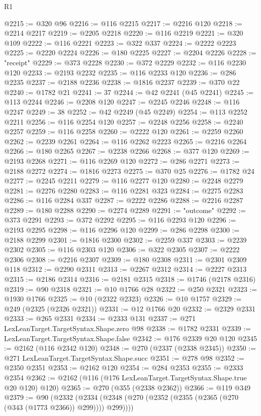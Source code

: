 \begin{lexlean}{R1}
\begin{coremodule}
@2215 := @320 @96
@2216 := @116 @2215
@2217 := @2216 @120
@2218 := @2214 @2217
@2219 := @2205 @2218
@2220 := @116 @2219
@2221 := @320 @109
@2222 := @116 @2221
@2223 := @322 @337
@2224 := @2222 @2223
@2225 := @2220 @2224
@2226 := @180 @2225
@2227 := @2204 @2226
@2228 := "receipt"
@2229 := @373 @2228
@2230 := @372 @2229
@2232 := @116 @2230 @120
@2233 := @2193 @2232
@2235 := @116 @2233 @120
@2236 := @286 @2235
@2237 := @2188 @2236
@2238 := @1816 @2237
@2239 := @370 @22
@2240 := @1782 @21
@2241 := 37
@2244 := @42 @2241 (@45 @2241)
@2245 := @113 @2244
@2246 := @2208 @120
@2247 := @2245 @2246
@2248 := @116 @2247
@2249 := 38
@2252 := @42 @2249 (@45 @2249)
@2254 := @113 @2252 @2211
@2256 := @116 @2254 @120
@2257 := @2248 @2256
@2258 := @2240 @2257
@2259 := @116 @2258
@2260 := @2222 @120
@2261 := @2259 @2260
@2262 := @2239 @2261
@2264 := @116 @2262 @2223
@2265 := @2216 @2264
@2266 := @180 @2265
@2267 := @2238 @2266
@2268 := @377 @120
@2269 := @2193 @2268
@2271 := @116 @2269 @120
@2272 := @286 @2271
@2273 := @2188 @2272
@2274 := @1816 @2273
@2275 := @370 @25
@2276 := @1782 @24
@2277 := @2245 @2211
@2279 := @116 @2277 @120
@2280 := @2248 @2279
@2281 := @2276 @2280
@2283 := @116 @2281 @323
@2284 := @2275 @2283
@2286 := @116 @2284 @337
@2287 := @2222 @2286
@2288 := @2216 @2287
@2289 := @180 @2288
@2290 := @2274 @2289
@2291 := "outcome"
@2292 := @373 @2291
@2293 := @372 @2292
@2295 := @116 @2293 @120
@2296 := @2193 @2295
@2298 := @116 @2296 @120
@2299 := @286 @2298
@2300 := @2188 @2299
@2301 := @1816 @2300
@2302 := @2259 @337
@2303 := @2239 @2302
@2305 := @116 @2303 @120
@2306 := @322 @2305
@2307 := @2222 @2306
@2308 := @2216 @2307
@2309 := @180 @2308
@2311 := @2301 @2309 @118
@2312 := @2290 @2311
@2313 := @2267 @2312
@2314 := @2227 @2313
@2315 := @2186 @2314
@2316 := @2181 @2315
@2318 := @1746 (@2178 @2316)
@2319 := @90 @2318
@2321 := @10 @1766 @28
@2322 := @250 @2321
@2323 := @1930 @1766
@2325 := @10 (@2322 @2323)
@2326 := @10 @1757
@2329 := @249 (@2325 (@2326 @2321))
@2331 := @12 @1766 @20
@2332 := @2329 @2331
@2333 := @265 @2331
@2334 := @2333 @131
@2337 := @271 LexLeanTarget.TargetSyntax.Shape.zero @98
@2338 := @1782 @2331
@2339 := LexLeanTarget.TargetSyntax.Shape.false
@2342 := @176 @2339 @20 @120
@2345 := @2162 (@116 @2342 @120)
@2348 := @270 (@2337 (@2338 @2345))
@2350 := @271 LexLeanTarget.TargetSyntax.Shape.succ
@2351 := @278 @98
@2352 := @2350 @2351
@2353 := @2162 @120
@2354 := @284 @2353
@2355 := @2333 @2354
@2362 := @2162 (@116 (@176 LexLeanTarget.TargetSyntax.Shape.true @20 @120) @120)
@2365 := @270 (@355 (@2338 @2362))
@2366 := @119 @349
@2379 := @90
    (@2332 (@2334 (@2348 (@270 (@2352 (@2355 (@2365 (@270 (@343 (@1773 @2366)) @299)))) @299))))

\end{coremodule}
\end{lexlean}
